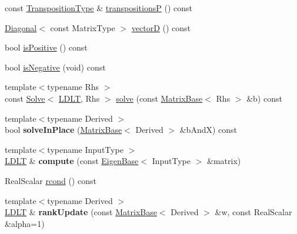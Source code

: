 \begin{DoxyCompactItemize}
\item 
const \hyperlink{group___core___module}{Transposition\+Type} \& \hyperlink{group___cholesky___module_a47257d3500f9f7c9a4478158d0e34941}{transpositionsP} () const
\item 
\hyperlink{group___core___module_class_eigen_1_1_diagonal}{Diagonal}$<$ const Matrix\+Type $>$ \hyperlink{group___cholesky___module_af60b2f826a38a00070e0efccf0572066}{vectorD} () const
\item 
bool \hyperlink{group___cholesky___module_a5e1c6b7ba8d7b82575d6ffdc3bf35bcb}{is\+Positive} () const
\item 
bool \hyperlink{group___cholesky___module_aabd3e7aebe844034caca4c62dbe9c1eb}{is\+Negative} (void) const
\item 
{\footnotesize template$<$typename Rhs $>$ }\\const \hyperlink{group___core___module_class_eigen_1_1_solve}{Solve}$<$ \hyperlink{group___cholesky___module_class_eigen_1_1_l_d_l_t}{L\+D\+LT}, Rhs $>$ \hyperlink{group___cholesky___module_aa257dd7a8acf8b347d5a22a13d6ca3e1}{solve} (const \hyperlink{group___core___module_class_eigen_1_1_matrix_base}{Matrix\+Base}$<$ Rhs $>$ \&b) const
\item 
\mbox{\label{group___cholesky___module_a56c31a5716aa8369f9bbc1a93b2020c3}} 
{\footnotesize template$<$typename Derived $>$ }\\bool {\bfseries solve\+In\+Place} (\hyperlink{group___core___module_class_eigen_1_1_matrix_base}{Matrix\+Base}$<$ Derived $>$ \&b\+AndX) const
\item 
\mbox{\label{group___cholesky___module_aef70371f07bf006a85250bfaeed2f992}} 
{\footnotesize template$<$typename Input\+Type $>$ }\\\hyperlink{group___cholesky___module_class_eigen_1_1_l_d_l_t}{L\+D\+LT} \& {\bfseries compute} (const \hyperlink{group___core___module_struct_eigen_1_1_eigen_base}{Eigen\+Base}$<$ Input\+Type $>$ \&matrix)
\item 
Real\+Scalar \hyperlink{group___cholesky___module_ae646403fdde3a4b18e278a32c61a0953}{rcond} () const
\item 
\mbox{\label{group___cholesky___module_a1bdbfbf648360fdb49b8f88cf78b0558}} 
{\footnotesize template$<$typename Derived $>$ }\\\hyperlink{group___cholesky___module_class_eigen_1_1_l_d_l_t}{L\+D\+LT} \& {\bfseries rank\+Update} (const \hyperlink{group___core___module_class_eigen_1_1_matrix_base}{Matrix\+Base}$<$ Derived $>$ \&w, const Real\+Scalar \&alpha=1)

\end{DoxyCompactItemize}
